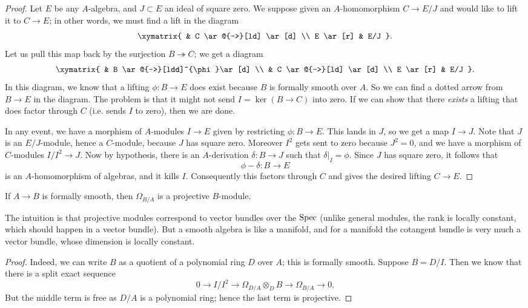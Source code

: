 \begin{proof}
Let $E$ be any $A$-algebra, and $J \subset E$
an ideal of square zero.
We suppose given an $A$-homomorphism $C \to E/J$
and would like to lift it to $C \to E$; in other words, we must 
find a lift in the diagram
\[ \xymatrix{
& C \ar@{-->}[ld] \ar[d]  \\
E \ar[r] & E/J
}.\]
Let us pull this map back by the surjection 
$B \twoheadrightarrow C$; we get a diagram
\[ \xymatrix{
& B \ar@{-->}[ldd]^{\phi}\ar[d] \\
& C \ar@{-->}[ld] \ar[d]  \\
E \ar[r] & E/J
}.\]
In this diagram, we know that a lifting $\phi: B \to E$ does exist because $B$ is
formally smooth over $A$.
So we can find a dotted arrow from $B \to E$ in the diagram.
The problem is that it might not send
$I = \ker(B \to C) $ into zero.
If we can show that there \emph{exists} a lifting that does factor through $C$
(i.e. sends $I$ to zero), then we are done.

In any event, we have a morphism of $A$-modules
$  I \to E$  given by restricting $\phi: B \to E$.
This lands in $J$, so we get a map $I \to J$. Note that $J$ is an $E/J$-module,
hence a $C$-module, because $J$ has square zero. Moreover $I^2$ gets sent to
zero because $J^2 = 0$, and we have a morphism of
$C$-modules $I/I^2 \to J$.
Now by hypothesis, there is an $A$-derivation
$\delta: B \to J$ such that $\delta|_I = \phi$.
Since $J$ has square zero, it follows that
\[ \phi - \delta: B \to E  \]
is an $A$-homomorphism of algebras, and it kills $I$.
Consequently this factors through $C$ and gives the desired lifting $C \to E$.



\end{proof} 

\begin{corollary} 
If $A \to B$ is formally smooth, then 
$\Omega_{B/A}$ is a projective $B$-module.
\end{corollary} 
The intuition is that projective modules correspond to vector bundles
over the $\operatorname{Spec}$ (unlike general modules, the rank is locally constant,
which should happen in a vector bundle). But a smooth algebra is like a
manifold, and for a manifold the cotangent bundle is very much a vector
bundle, whose dimension is locally constant. 
\begin{proof} 
Indeed, we can write $B$ as a quotient of a polynomial ring $D$ over $A$; this
is formally smooth. Suppose $B = D/I$.
Then we know that there is a split exact sequence
\[ 0 \to I/I^2 \to \Omega_{D/A} \otimes_D B \to \Omega_{B/A} \to 0.  \]
But the middle term is free as $D/A$ is a polynomial ring; hence the last term
is projective.
\end{proof} 
